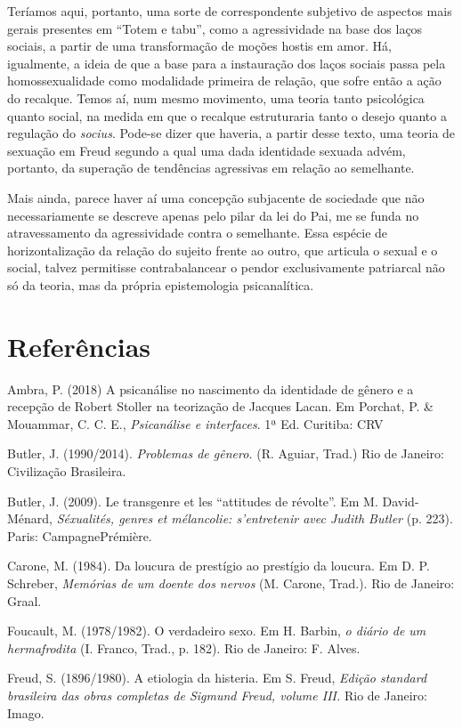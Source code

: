 Teríamos aqui, portanto, uma sorte de correspondente subjetivo de
aspectos mais gerais presentes em ``Totem e tabu'', como a agressividade
na base dos laços sociais, a partir de uma transformação de moções
hostis em amor. Há, igualmente, a ideia de que a base para a instauração
dos laços sociais passa pela homossexualidade como modalidade primeira
de relação, que sofre então a ação do recalque. Temos aí, num mesmo
movimento, uma teoria tanto psicológica quanto social, na medida em que
o recalque estruturaria tanto o desejo quanto a regulação do
\emph{socius}. Pode-se dizer que haveria, a partir desse texto, uma
teoria de sexuação em Freud segundo a qual uma dada identidade sexuada
advém, portanto, da superação de tendências agressivas em relação ao
semelhante.

Mais ainda, parece haver aí uma concepção subjacente de sociedade que
não necessariamente se descreve apenas pelo pilar da lei do Pai, me se
funda no atravessamento da agressividade contra o semelhante. Essa
espécie de horizontalização da relação do sujeito frente ao outro, que
articula o sexual e o social, talvez permitisse contrabalancear o pendor
exclusivamente patriarcal não só da teoria, mas da própria epistemologia
psicanalítica.

\section{Referências}

Ambra, P. (2018) A psicanálise no nascimento da identidade de gênero e a
recepção de Robert Stoller na teorização de Jacques Lacan. Em Porchat,
P. \& Mouammar, C. C. E., \emph{Psicanálise e interfaces}. 1ª Ed.
Curitiba: CRV

Butler, J. (1990/2014). \emph{Problemas de gênero.} (R. Aguiar, Trad.)
Rio de Janeiro: Civilização Brasileira.

Butler, J. (2009). Le transgenre et les ``attitudes de révolte''. Em M.
David-Ménard, \emph{Séxualités, genres et mélancolie: s'entretenir avec
Judith Butler} (p. 223). Paris: CampagnePrémière.

Carone, M. (1984). Da loucura de prestígio ao prestígio da loucura. Em
D. P. Schreber, \emph{Memórias de um doente dos nervos} (M. Carone,
Trad.). Rio de Janeiro: Graal.

Foucault, M. (1978/1982). O verdadeiro sexo. Em H. Barbin, \emph{o
diário de um hermafrodita} (I. Franco, Trad., p. 182). Rio de Janeiro:
F. Alves.

Freud, S. (1896/1980). A etiologia da histeria. Em S. Freud,
\emph{Edição standard brasileira das obras completas de Sigmund Freud,
volume III.} Rio de Janeiro: Imago.

